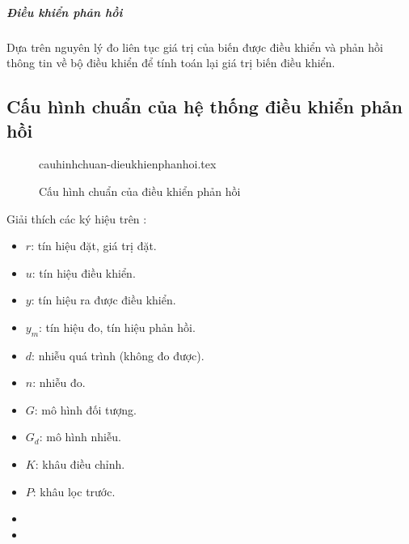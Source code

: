\subparagraph{Điều khiển phản hồi} Dựa trên nguyên lý đo liên tục giá trị của biến được điều khiển và phản hồi thông tin về bộ điều khiển để tính toán lại giá trị biến điều khiển.

\subsection{Cấu hình chuẩn của hệ thống điều khiển phản hồi}
    \begin{figure}[htp]
        \begin{center}
            {cauhinhchuan-dieukhienphanhoi.tex}
        \end{center}
        \caption{Cấu hình chuẩn của điều khiển phản hồi} \label{Fig:cauhinhchuan-dieukhienphanhoi}
    \end{figure}

    Giải thích các ký hiệu trên \fig{\ref{Fig:cauhinhchuan-dieukhienphanhoi}}:
        \begin{multicols}{2}
            \begin{itemize}
                \item $r$: tín hiệu đặt, giá trị đặt.
                \item $u$: tín hiệu điều khiển.
                \item $y$: tín hiệu ra được điều khiển.
                \item $y_m$: tín hiệu đo, tín hiệu phản hồi.
                \item $d$: nhiễu quá trình (không đo được).
                \item $n$: nhiễu đo.
            \end{itemize}

            \columnbreak

            \begin{itemize}
                \item $G$: mô hình đối tượng.
                \item $G_d$: mô hình nhiễu.
                \item $K$: khâu điều chỉnh.
                \item $P$: khâu lọc trước.
                \item[]
                \item[]
            \end{itemize}
        \end{multicols}

